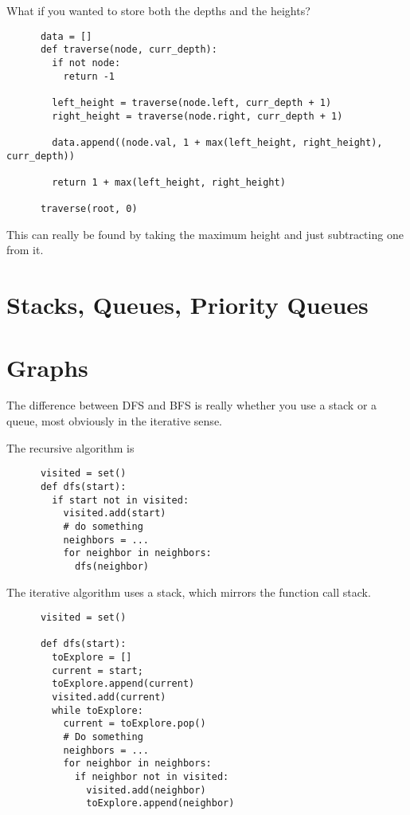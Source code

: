 \documentclass{article}
\begin{document}
  What if you wanted to store both the depths and the heights? 

  \begin{lstlisting}
      data = []
      def traverse(node, curr_depth): 
        if not node: 
          return -1

        left_height = traverse(node.left, curr_depth + 1)
        right_height = traverse(node.right, curr_depth + 1)

        data.append((node.val, 1 + max(left_height, right_height), curr_depth))

        return 1 + max(left_height, right_height)

      traverse(root, 0) 
  \end{lstlisting}

  \begin{example}
    This can really be found by taking the maximum height and just subtracting one from it. 
  \end{example}

\section{Stacks, Queues, Priority Queues}

  

\section{Graphs} 

  The difference between DFS and BFS is really whether you use a stack or a queue, most obviously in the iterative sense. 

  \begin{definition}[DFS]
    The recursive algorithm is 
    \begin{lstlisting}
      visited = set() 
      def dfs(start): 
        if start not in visited: 
          visited.add(start) 
          # do something 
          neighbors = ... 
          for neighbor in neighbors: 
            dfs(neighbor)
    \end{lstlisting}

    The iterative algorithm uses a stack, which mirrors the function call stack. 
    \begin{lstlisting}
      visited = set() 

      def dfs(start): 
        toExplore = [] 
        current = start; 
        toExplore.append(current) 
        visited.add(current) 
        while toExplore: 
          current = toExplore.pop() 
          # Do something
          neighbors = ... 
          for neighbor in neighbors: 
            if neighbor not in visited: 
              visited.add(neighbor) 
              toExplore.append(neighbor)
    \end{lstlisting}
  \end{definition}
\end{document}
